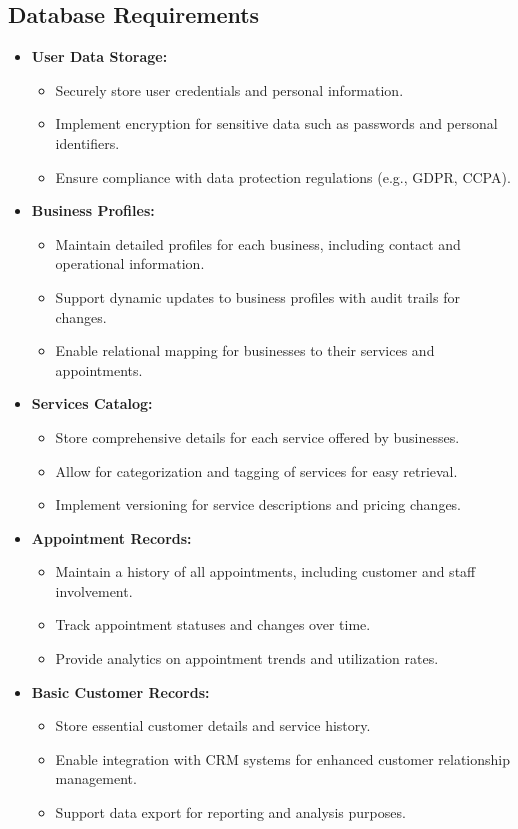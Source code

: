 \subsection{Database Requirements}
\begin{itemize}[leftmargin=*]
    \item \textbf{User Data Storage:}
    \begin{itemize}
        \item Securely store user credentials and personal information.
        \item Implement encryption for sensitive data such as passwords and personal identifiers.
        \item Ensure compliance with data protection regulations (e.g., GDPR, CCPA).
    \end{itemize}
    
    \item \textbf{Business Profiles:}
    \begin{itemize}
        \item Maintain detailed profiles for each business, including contact and operational information.
        \item Support dynamic updates to business profiles with audit trails for changes.
        \item Enable relational mapping for businesses to their services and appointments.
    \end{itemize}
    
    \item \textbf{Services Catalog:}
    \begin{itemize}
        \item Store comprehensive details for each service offered by businesses.
        \item Allow for categorization and tagging of services for easy retrieval.
        \item Implement versioning for service descriptions and pricing changes.
    \end{itemize}
    
    \item \textbf{Appointment Records:}
    \begin{itemize}
        \item Maintain a history of all appointments, including customer and staff involvement.
        \item Track appointment statuses and changes over time.
        \item Provide analytics on appointment trends and utilization rates.
    \end{itemize}
    
    \item \textbf{Basic Customer Records:}
    \begin{itemize}
        \item Store essential customer details and service history.
        \item Enable integration with CRM systems for enhanced customer relationship management.
        \item Support data export for reporting and analysis purposes.
    \end{itemize}
\end{itemize}